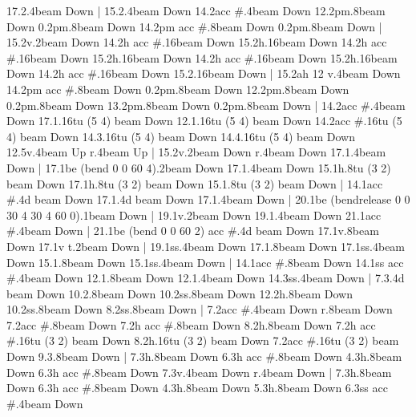       17.2.4{beam Down}
    |
      15.2.4{beam Down}
      14.2{acc #}.4{beam Down}
      12.2{pm}.8{beam Down}
      0.2{pm}.8{beam Down}
      14.2{pm acc #}.8{beam Down}
      0.2{pm}.8{beam Down}
    |
      15.2{v}.2{beam Down}
      14.2{h acc #}.16{beam Down}
      15.2{h}.16{beam Down}
      14.2{h acc #}.16{beam Down}
      15.2{h}.16{beam Down}
      14.2{h acc #}.16{beam Down}
      15.2{h}.16{beam Down}
      14.2{h acc #}.16{beam Down}
      15.2.16{beam Down}
    |
      15.2{ah 12 v}.4{beam Down}
      14.2{pm acc #}.8{beam Down}
      0.2{pm}.8{beam Down}
      12.2{pm}.8{beam Down}
      0.2{pm}.8{beam Down}
      13.2{pm}.8{beam Down}
      0.2{pm}.8{beam Down}
    |
      14.2{acc #}.4{beam Down}
      17.1.16{tu (5 4) beam Down}
      12.1.16{tu (5 4) beam Down}
      14.2{acc #}.16{tu (5 4) beam Down}
      14.3.16{tu (5 4) beam Down}
      14.4.16{tu (5 4) beam Down}
      12.5{v}.4{beam Up}
      r.4{beam Up}
    |
      15.2{v}.2{beam Down}
      r.4{beam Down}
      17.1.4{beam Down}
    |
      17.1{be (bend 0 0 60 4)}.2{beam Down}
      17.1.4{beam Down}
      15.1{h}.8{tu (3 2) beam Down}
      17.1{h}.8{tu (3 2) beam Down}
      15.1.8{tu (3 2) beam Down}
    |
      14.1{acc #}.4{d beam Down}
      17.1.4{d beam Down}
      17.1.4{beam Down}
    |
      20.1{be (bendrelease 0 0 30 4 30 4 60 0)}.1{beam Down}
    |
      19.1{v}.2{beam Down}
      19.1.4{beam Down}
      21.1{acc #}.4{beam Down}
    |
      21.1{be (bend 0 0 60 2) acc #}.4{d beam Down}
      17.1{v}.8{beam Down}
      17.1{v t}.2{beam Down}
    |
      19.1{ss}.4{beam Down}
      17.1.8{beam Down}
      17.1{ss}.4{beam Down}
      15.1.8{beam Down}
      15.1{ss}.4{beam Down}
    |
      14.1{acc #}.8{beam Down}
      14.1{ss acc #}.4{beam Down}
      12.1.8{beam Down}
      12.1.4{beam Down}
      14.3{ss}.4{beam Down}
    |
      7.3.4{d beam Down}
      10.2.8{beam Down}
      10.2{ss}.8{beam Down}
      12.2{h}.8{beam Down}
      10.2{ss}.8{beam Down}
      8.2{ss}.8{beam Down}
    |
      7.2{acc #}.4{beam Down}
      r.8{beam Down}
      7.2{acc #}.8{beam Down}
      7.2{h acc #}.8{beam Down}
      8.2{h}.8{beam Down}
      7.2{h acc #}.16{tu (3 2) beam Down}
      8.2{h}.16{tu (3 2) beam Down}
      7.2{acc #}.16{tu (3 2) beam Down}
      9.3.8{beam Down}
    |
      7.3{h}.8{beam Down}
      6.3{h acc #}.8{beam Down}
      4.3{h}.8{beam Down}
      6.3{h acc #}.8{beam Down}
      7.3{v}.4{beam Down}
      r.4{beam Down}
    |
      7.3{h}.8{beam Down}
      6.3{h acc #}.8{beam Down}
      4.3{h}.8{beam Down}
      5.3{h}.8{beam Down}
      6.3{ss acc #}.4{beam Down}
